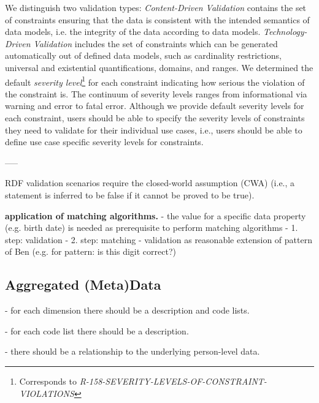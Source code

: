 \documentclass{llncs}
\newcommand{\tb}[1]{\todo[size=\small, color=green!40]{\textbf{Thomas:} #1}}
\begin{document}
We distinguish two validation types:
\emph{Content-Driven Validation} contains the set of constraints ensuring that the data is consistent with the intended semantics of data models,
i.e. the integrity of the data according to data models.
\emph{Technology-Driven Validation} includes the set of constraints which can be generated automatically out of defined data models, such as cardinality restrictions, universal and existential quantifications, domains, and ranges.
We determined the default \emph{severity level}\footnote{Corresponds to \emph{R-158-SEVERITY-LEVELS-OF-CONSTRAINT-VIOLATIONS}} for each constraint indicating how serious the violation of the constraint is.
The continuum of severity levels ranges from informational via warning and error to fatal error. 
Although we provide default severity levels for each constraint, users should be able to specify the severity levels of constraints they need to validate for their individual use cases, i.e., users should be able to define use case specific severity levels for constraints.

-----
%
%
%

RDF validation scenarios require the closed-world assumption (CWA) (i.e., a statement is inferred to be false if it cannot be proved to be true).

\textbf{application of matching algorithms.}
- the value for a specific data property (e.g. birth date) is needed as prerequisite to perform matching algorithms
- 1. step: validation
- 2. step: matching
- validation as reasonable extension of pattern of Ben (e.g. for pattern: is this digit correct?)


\subsection{Aggregated (Meta)Data}

\tb{ToDo}

- for each dimension there should be a description and code lists.

- for each code list there should be a description.

- there should be a relationship to the underlying person-level data.
\end{document}
